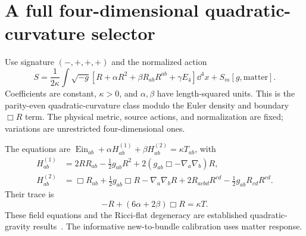\documentclass[11pt]{article}
\begin{document}
\section{A full four-dimensional quadratic-curvature selector}
Use signature $(-,+,+,+)$ and the normalized action
\begin{equation}\label{eq:quadratic}
S=\frac1{2\kappa}\int\sqrt{-g}\left[R+\alpha R^2+\beta R_{ab}R^{ab}
+\gamma E_4\right]\dd^4x+S_m[g,\mathrm{matter}].
\end{equation}
Coefficients are constant, $\kappa>0$, and $\alpha,\beta$ have length-squared units. This is the parity-even quadratic-curvature class modulo the Euler density and boundary $\Box R$ term. The physical metric, source actions, and normalization are fixed; variations are unrestricted four-dimensional ones.

The equations are $\operatorname{Ein}_{ab}+\alpha H^{(1)}_{ab}+\beta H^{(2)}_{ab}=\kappa T_{ab}$, with
\begin{align}
H^{(1)}_{ab}&=2RR_{ab}-\tfrac12g_{ab}R^2+2(g_{ab}\Box-\nabla_a\nabla_b)R,\\
H^{(2)}_{ab}&=\Box R_{ab}+\tfrac12g_{ab}\Box R-\nabla_a\nabla_bR
+2R_{acbd}R^{cd}-\tfrac12g_{ab}R_{cd}R^{cd}.
\end{align}
Their trace is
\begin{equation}\label{eq:trace}
-R+(6\alpha+2\beta)\Box R=\kappa T.
\end{equation}
These field equations and the Ricci-flat degeneracy are established quadratic-gravity results~\cite{Pravda,Salvio}. The informative new-to-bundle calibration uses matter response.
\end{document}

